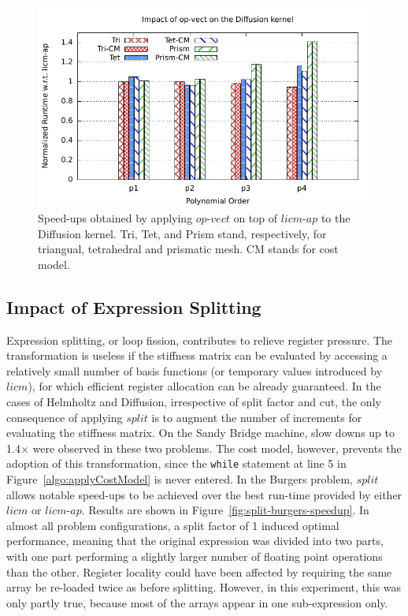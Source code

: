 \documentclass[conference]{IEEEtran}
\begin{document}
\begin{figure}[h]
\includegraphics[scale=0.7]{Pictures/diffusion-normalized-opvect.pdf}
\caption{Speed-ups obtained by applying $op$-$vect$ on top of $licm$-$ap$ to the Diffusion kernel. Tri, Tet, and Prism stand, respectively, for triangual, tetrahedral and prismatic mesh. CM stands for cost model.}
\label{fig:opvect-diffusion-speedup}
\end{figure}


\subsection{Impact of Expression Splitting}
\label{sec:perf-results-split}
Expression splitting, or loop fission, contributes to relieve register pressure. The transformation is useless if the stiffness matrix can be evaluated by accessing a relatively small number of basis functions (or temporary values introduced by $licm$), for which efficient register allocation can be already guaranteed. In the cases of Helmholtz and Diffusion, irrespective of split factor and cut, the only consequence of applying $split$ is to augment the number of increments for evaluating the stiffness matrix. On the Sandy Bridge machine, slow downs up to 1.4$\times$ were observed in these two problems. The cost model, however, prevents the adoption of this transformation, since the \texttt{while} statement at line 5 in Figure~\ref{algo:applyCostModel} is never entered. In the Burgers problem, $split$ allows notable speed-ups to be achieved over the best run-time provided by either $licm$ or $licm$-$ap$. Results are shown in Figure~\ref{fig:split-burgers-speedup}. In almost all problem configurations, a split factor of 1 induced optimal performance, meaning that the original expression was divided into two parts, with one part performing a slightly larger number of floating point operations than the other. Register locality could have been affected by requiring the same array be re-loaded twice as before splitting. However, in this experiment, this was only partly true, because most of the arrays appear in one sub-expression only. 
\end{document}
